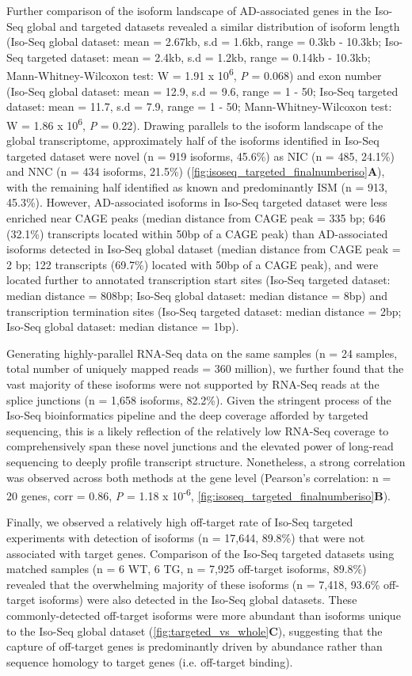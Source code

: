 Further comparison of the isoform landscape of AD-associated genes in the Iso-Seq global and targeted datasets revealed a similar distribution of isoform length (Iso-Seq global dataset: mean = 2.67kb, s.d = 1.6kb, range = 0.3kb - 10.3kb; Iso-Seq targeted dataset: mean = 2.4kb, s.d = 1.2kb, range = 0.14kb - 10.3kb; Mann-Whitney-Wilcoxon test: W = 1.91 x 10\textsuperscript{6}, \textit{P} = 0.068) and exon number (Iso-Seq global dataset: mean = 12.9, s.d = 9.6, range = 1 - 50; Iso-Seq targeted dataset: mean = 11.7, s.d = 7.9, range = 1 - 50; Mann-Whitney-Wilcoxon test: W = 1.86 x 10\textsuperscript{6}, \textit{P} = 0.22). Drawing parallels to the isoform landscape of the global transcriptome, approximately half of the isoforms identified in Iso-Seq targeted dataset were novel (n = 919 isoforms, 45.6\%) as NIC (n = 485, 24.1\%) and NNC (n = 434 isoforms, 21.5\%) (\cref{fig:isoseq_targeted_finalnumberiso}\textbf{A}), with the remaining half identified as known and predominantly ISM (n = 913, 45.3\%). However, AD-associated isoforms in Iso-Seq targeted dataset were less enriched near CAGE peaks (median distance from CAGE peak = 335 bp; 646 (32.1\%) transcripts located within 50bp of a CAGE peak) than AD-associated isoforms detected in Iso-Seq global dataset (median distance from CAGE peak = 2 bp; 122 transcripts (69.7\%) located with 50bp of a CAGE peak), and were located further to annotated transcription start sites (Iso-Seq targeted dataset: median distance = 808bp; Iso-Seq global dataset: median distance = 8bp) and transcription termination sites (Iso-Seq targeted dataset: median distance = 2bp; Iso-Seq global dataset: median distance = 1bp). 

Generating highly-parallel RNA-Seq data on the same samples (n = 24 samples, total number of uniquely mapped reads = 360 million), we further found that the vast majority of these isoforms were not supported by RNA-Seq reads at the splice junctions (n = 1,658 isoforms, 82.2\%). Given the stringent process of the Iso-Seq bioinformatics pipeline and the deep coverage afforded by targeted sequencing, this is a likely reflection of the relatively low RNA-Seq coverage to comprehensively span these novel junctions and the elevated power of long-read sequencing to deeply profile transcript structure. Nonetheless, a strong correlation was observed across both methods at the gene level (Pearson's correlation: n = 20 genes, corr = 0.86, \textit{P} = 1.18 x 10\textsuperscript{-6}, \cref{fig:isoseq_targeted_finalnumberiso}\textbf{B}). 

Finally, we observed a relatively high off-target rate of Iso-Seq targeted experiments with detection of isoforms (n = 17,644, 89.8\%) that were not associated with target genes. Comparison of the Iso-Seq targeted datasets using matched samples (n = 6 WT, 6 TG, n = 7,925 off-target isoforms, 89.8\%) revealed that the overwhelming majority of these isoforms (n = 7,418, 93.6\% off-target isoforms) were also detected in the Iso-Seq global datasets. These commonly-detected off-target isoforms were more abundant than isoforms unique to the Iso-Seq global dataset (\cref{fig:targeted_vs_whole}\textbf{C}), suggesting that the capture of off-target genes is predominantly driven by abundance rather than sequence homology to target genes (i.e. off-target binding).  

